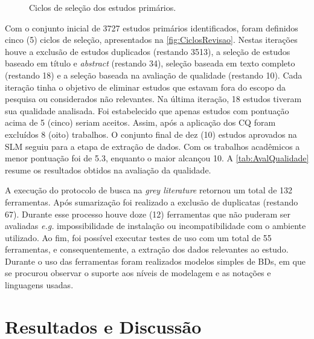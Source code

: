 \begin{figure}[!htb]
	\centering
	    \caption{Ciclos de seleção dos estudos primários.}
        
	\label{fig:CiclosRevisao}
\end{figure}

Com o conjunto inicial de 3727 estudos primários identificados, 
foram definidos cinco (5) ciclos de seleção, apresentados na \autoref{fig:CiclosRevisao}. 
Nestas iterações houve a exclusão de estudos duplicados (restando 3513), a seleção de estudos baseado em título e \textit{abstract} (restando 34), seleção baseada em texto completo (restando 18) e a seleção baseada na avaliação de qualidade (restando 10). 
Cada iteração tinha o objetivo de eliminar estudos que estavam fora do escopo da pesquisa ou considerados não relevantes. 
Na última iteração, 18 estudos tiveram sua qualidade analisada. 
Foi estabelecido que apenas estudos com pontuação acima de 5 (cinco) seriam aceitos. 
Assim, após a aplicação dos \ac{CQ} foram excluídos 8 (oito) trabalhos. 
O conjunto final de dez (10) estudos aprovados na \ac{SLM} seguiu para a etapa de extração de dados. 
Com os trabalhos acadêmicos a menor pontuação foi de 5.3, enquanto o maior alcançou 10. 
A \autoref{tab:AvalQualidade} resume os resultados obtidos na avaliação da qualidade. 

A execução do protocolo de busca na \textit{grey literature} retornou um total de 132 ferramentas. 
Após sumarização foi realizado a exclusão de duplicatas (restando 67).
Durante esse processo houve doze (12) ferramentas que não puderam ser avaliadas 
\textit{e.g.} impossibilidade de instalação ou incompatibilidade com o ambiente utilizado. 
Ao fim, foi possível executar testes de uso com um total de 55 ferramentas, e consequentemente, a extração dos dados relevantes ao estudo. 
Durante o uso das ferramentas foram realizados modelos simples de \acp{BD}, em que se procurou observar o suporte aos níveis de modelagem e as notações e linguagens usadas.

\section{Resultados e Discussão} \label{sec:ResultDis}

